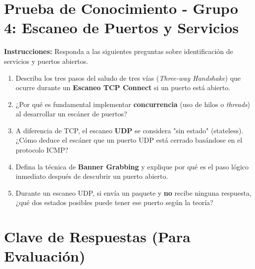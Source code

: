 \documentclass[12pt,a4paper]{article}
\begin{document}
\vspace{1cm}

\section{Prueba de Conocimiento - Grupo 4: Escaneo de Puertos y Servicios}
\textbf{Instrucciones:} Responda a las siguientes preguntas sobre identificación de servicios y puertos abiertos.

\begin{enumerate}[label=\textbf{\arabic*.}]
    \item Describa los tres pasos del saludo de tres vías (\textit{Three-way Handshake}) que ocurre durante un \textbf{Escaneo TCP Connect} si un puerto está abierto.
    \item ¿Por qué es fundamental implementar \textbf{concurrencia} (uso de hilos o \textit{threads}) al desarrollar un escáner de puertos?
    \item A diferencia de TCP, el escaneo \textbf{UDP} se considera "sin estado" (stateless). ¿Cómo deduce el escáner que un puerto UDP está cerrado basándose en el protocolo ICMP?
    \item Defina la técnica de \textbf{Banner Grabbing} y explique por qué es el paso lógico inmediato después de descubrir un puerto abierto.
    \item Durante un escaneo UDP, si envía un paquete y \textbf{no} recibe ninguna respuesta, ¿qué dos estados posibles puede tener ese puerto según la teoría?
\end{enumerate}

\newpage


\section{Clave de Respuestas (Para Evaluación)}
\end{document}
